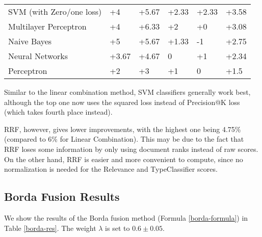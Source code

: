 \begin{table}
{\begin{tabular}{@{}llllll@{}}
SVM (with Zero/one loss)                       	& +4                       & +5.67                       & +2.33                    & +2.33                       & +3.58             \\
Multilayer Perceptron				& +4 			   & +6.33 			 & +2 			    & +0 			  & +3.08 \\
Naive Bayes                                    	& +5                       & +5.67                       & +1.33                    & -1                          & +2.75             \\
Neural Networks                              	& +3.67                    & +4.67                       & 0                        & +1                          & +2.34             \\
Perceptron                                     	& +2                       & +3                          & +1                       & 0                           & +1.5              \\ \bottomrule
\end{tabular}%
}
\end{table}

Similar to the linear combination method, SVM classifiers generally work best,
although the top one now uses the squared loss instead of Precision@K loss (which takes fourth place instead).

RRF, however, gives lower improvements, with the highest one being 4.75\%
(compared to 6\% for Linear Combination).
This may be due to the fact that RRF loses some information by only using document ranks instead of raw scores. On the other hand, RRF
is easier and more convenient to compute, since no normalization is needed for the \textsf{Relevance} and \textsf{TypeClassifier} scores.


\subsection{Borda Fusion Results}
We show the results of the Borda fusion method (Formula \ref{borda-formula}) in Table \ref{borda-res}.
The weight $\lambda$ is set to $0.6\pm 0.05$.

